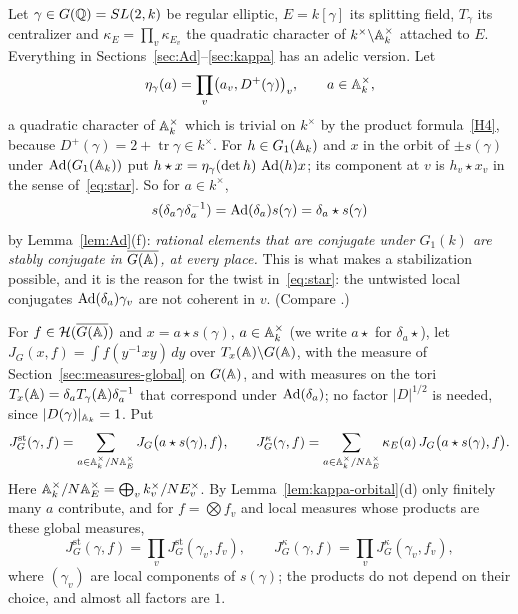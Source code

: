 Let $\gamma\in G(\mathbb{Q})=SL(2,k)$ be regular elliptic, $E=k[\gamma]$ its
splitting field, $T_\gamma$ its centralizer and $\kappa_E=\prod_v\kappa_{E_v}$
the quadratic character of $k^\times\backslash\mathbb{A}_k^\times$ attached to
$E$. Everything in Sections~\ref{sec:Ad}--\ref{sec:kappa} has an adelic
version. Let
\[
\eta_\gamma(a)=\prod_v\bigl(a_v,D^+(\gamma)\bigr)_v,\qquad a\in\mathbb{A}_k^\times,
\]
a quadratic character of $\mathbb{A}_k^\times$ which is trivial on $k^\times$ by
the product formula~\ref{H4}, because $D^+(\gamma)=2+\operatorname{tr}
\gamma\in k^\times$. For $h\in G_1(\mathbb{A}_k)$ and $x$ in the orbit of
$\pm s(\gamma)$ under $\operatorname{Ad}(G_1(\mathbb{A}_k))$ put
$h\star x=\eta_\gamma(\det h)\,\operatorname{Ad}(h)x$; its component at $v$ is
$h_v\star x_v$ in the sense of~\eqref{eq:star}. So for $a\in k^\times$,
\begin{equation}\label{eq:rational-stable}
s(\delta_a\gamma\delta_a^{-1})=\operatorname{Ad}(\delta_a)s(\gamma)=\delta_a
\star s(\gamma)
\end{equation}
by Lemma~\ref{lem:Ad}(f): \emph{rational elements that are conjugate
under $G_1(k)$ are stably conjugate in $\overline{G(\mathbb{A})}$, at every place.} This is
what makes a stabilization possible, and it is the reason for the twist
in~\eqref{eq:star}: the untwisted local conjugates
$\operatorname{Ad}(\delta_a)\gamma_v$ are not coherent in $v$. (Compare
\cite[Lemme~4.1.7]{Li15}.)

For $f\in\mathcal H(\overline{G(\mathbb{A})})$ and $x=a\star s(\gamma)$, $a\in\mathbb{A}_k^\times$
(we write $a\star$ for $\delta_a\star$), let $J_G(x,f)=\int f(y^{-1}xy)\,
dy$ over $T_x(\mathbb{A})\backslash G(\mathbb{A})$, with the measure of Section~\ref{sec:measures-global} on
$G(\mathbb{A})$, and with measures on the tori $T_x(\mathbb{A})=\delta_aT_\gamma(\mathbb{A})
\delta_a^{-1}$ that correspond under $\operatorname{Ad}(\delta_a)$; no factor $|D|^{1/2}$ is
needed, since $|D(\gamma)|_{\mathbb{A}_k}=1$. Put
\begin{equation}\label{eq:Jst-global}
J^{\mathrm{st}}_G(\gamma,f)=\sum_{a\in\mathbb{A}_k^\times/N\mathbb{A}_E^\times}J_G\bigl(a\star
s(\gamma),f\bigr),\qquad
J^{\kappa}_G(\gamma,f)=\sum_{a\in\mathbb{A}_k^\times/N\mathbb{A}_E^\times}\kappa_E(a)\,J_G\bigl(
a\star s(\gamma),f\bigr).
\end{equation}
Here $\mathbb{A}_k^\times/N\mathbb{A}_E^\times=\bigoplus_vk_v^\times/N E_v^\times$. By
Lemma~\ref{lem:kappa-orbital}(d) only finitely many $a$ contribute, and
for $f=\bigotimes f_v$ and local measures whose products are these global
measures,
\[
J^{\mathrm{st}}_G(\gamma,f)=\prod_vJ^{\mathrm{st}}_G(\gamma_v,f_v),\qquad
J^{\kappa}_G(\gamma,f)=\prod_vJ^{\kappa}_G(\gamma_v,f_v),
\]
where $(\gamma_v)$ are local components of $s(\gamma)$; the products do
not depend on their choice, and almost all factors are $1$.


